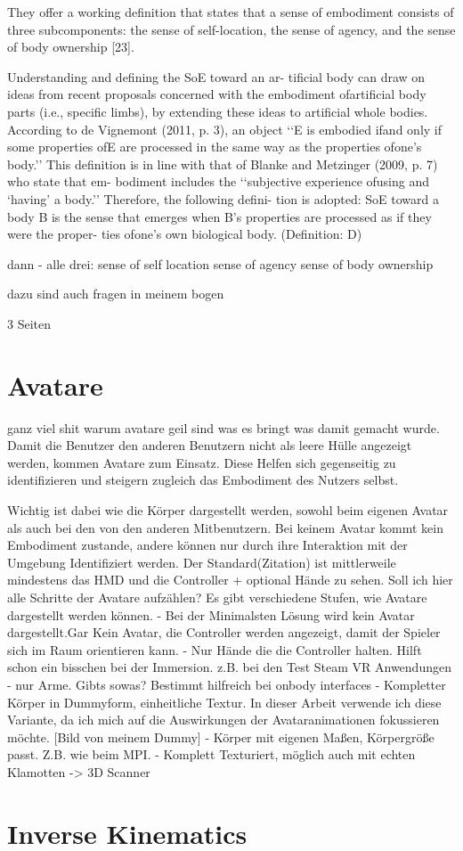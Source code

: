 They offer a working definition that states that a sense of embodiment consists of three subcomponents: the sense of self-location, the sense of agency, and the sense of body ownership [23].
\cite{Tham2018}

Understanding and defining the SoE toward an ar-
tificial body can draw on ideas from recent proposals concerned with the embodiment ofartificial body parts (i.e., specific limbs), by extending these ideas to artificial whole bodies. According to de Vignemont (2011, p. 3), an object ‘‘E is embodied ifand only if some properties ofE are processed in the same way as the properties ofone’s body.’’ This definition is in line with that of Blanke and Metzinger (2009, p. 7) who state that em- bodiment includes the ‘‘subjective experience ofusing and ‘having’ a body.’’ Therefore, the following defini- tion is adopted:
SoE toward a body B is the sense that emerges when
B’s properties are processed as if they were the proper- ties ofone’s own biological body. (Definition: D)
\cite{Kilteni2012}

dann - alle drei:
sense of self location
sense of agency
sense of body ownership

dazu sind auch fragen in meinem bogen



3 Seiten

\section{Avatare}
ganz viel shit warum avatare geil sind was es bringt was damit gemacht wurde.
Damit die Benutzer den anderen Benutzern nicht als leere Hülle angezeigt werden, kommen Avatare zum Einsatz. Diese Helfen sich gegenseitig zu identifizieren und steigern zugleich das Embodiment des Nutzers selbst. 

Wichtig ist dabei wie die Körper dargestellt werden, sowohl beim eigenen Avatar als auch bei den von den anderen Mitbenutzern. Bei keinem Avatar kommt kein Embodiment zustande, andere können nur durch ihre Interaktion mit der Umgebung Identifiziert werden. Der Standard(Zitation) ist mittlerweile mindestens das HMD und die Controller + optional Hände zu sehen. \cite{Benford2010}
Soll ich hier alle Schritte der Avatare aufzählen?
Es gibt verschiedene Stufen, wie Avatare dargestellt werden können.
- Bei der Minimalsten Lösung wird kein Avatar dargestellt.Gar Kein Avatar, die Controller werden angezeigt, damit der Spieler sich im Raum orientieren kann.
- Nur Hände die die Controller halten. Hilft schon ein bisschen bei der Immersion. z.B. bei den Test Steam VR Anwendungen
- nur Arme. Gibts sowas? Bestimmt hilfreich bei onbody interfaces
- Kompletter Körper in Dummyform, einheitliche Textur. In dieser Arbeit verwende ich diese Variante, da ich mich auf die Auswirkungen der Avataranimationen fokussieren möchte. 
[Bild von meinem Dummy]
- Körper mit eigenen Maßen, Körpergröße passt. Z.B. wie beim MPI. 
- Komplett Texturiert, möglich auch mit echten Klamotten -> 3D Scanner

\section{Inverse Kinematics}







